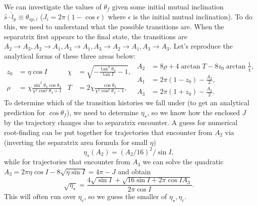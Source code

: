 \documentclass[11pt,
        usenames, %
        dvipsnames %
    ]{article}
\newcommand*{\p}[1]{\left(#1\right)}
\begin{document}
We can investigate the values of $\theta_f$ given some initial mutual
inclination $\hat{s} \cdot \hat{l}_p \equiv \theta_{sp, i}$ ($J_i = 2\pi\p{1 -
\cos \epsilon}$ where $\epsilon$ is the initial mutual inclination). To do this,
we need to understand what the possible transitions are. When the separatrix
first appears to the final state, the transitions are $A_2 \to A_3, A_2 \to A_1,
A_3 \to A_1, A_3 \to A_2 \to A_1, A_3 \to A_3$. Let's reproduce the analytical
forms of these three areas below:
\begin{subequations}
    \begin{align*}
        z_0 &= \eta\cos I &
        \chi &= \sqrt{-\frac{\tan^3\theta_4}{\tan I} - 1},\\
        \rho &= \chi \frac{\sin^2 \theta_4\cos \theta_4}{
            \chi^2 \cos^2\theta_4 + 1} &
        T &= 2\chi \frac{\cos \theta_4}{
            \chi^2 \cos^2\theta_4 - 1},
    \end{align*}
    \begin{align}
        A_2 &= 8\rho + 4\arctan T - 8z_0 \arctan \frac{1}{\chi},\\
        A_1 &= 2\pi\p{1 - z_0} - \frac{A_2}{2},\\
        A_3 &= 2\pi\p{1 + z_0} - \frac{A_2}{2}.
    \end{align}
\end{subequations}
To determine which of the transition histories we fall under (to get an
analytical prediction for $\cos \theta_f$), we need to determine $\eta_\star$,
so we know how the enclosed $J$ by the trajectory changes due to separatrix
encounter. A guess for numerical root-finding can be put together for
trajectories that encounter from $A_2$ via (inverting the separatrix area
formula for small $\eta$)
\begin{equation*}
    \eta_\star\p{A_2} = \p{A_2/16}^2 / \sin I,
\end{equation*}
while for trajectories that encounter from $A_3$ we can solve the quadratic $A_3
= 2\pi \eta \cos I - 8\sqrt{\eta \sin I} = 4\pi - J$ and obtain
\begin{equation*}
    \sqrt{\eta_\star} = \frac{4\sqrt{\sin I} + \sqrt{16\sin I + 2\pi \cos I
        A_3}}{ 2\pi \cos I}.
\end{equation*}
This will often run over $\eta_c$, so we guess the smaller of $\eta_\star,
\eta_c$.
\end{document}
